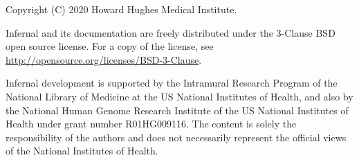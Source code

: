\newpage
\vspace*{\fill}
\begin{flushleft}

\vspace{2em}
Copyright (C) 2020 Howard Hughes Medical Institute.

\vspace{2em}
Infernal and its documentation are freely distributed under the 
3-Clause BSD open source license. For a copy of the license, see
\url{http://opensource.org/licenses/BSD-3-Clause}.

\vspace{2em}
Infernal development is supported by the Intramural Research Program
of the National Library of Medicine at the US National Institutes of
Health, and also by the National Human Genome Research Institute of
the US National Institutes of Health under grant number
R01HG009116. The content is solely the responsibility of the authors
and does not necessarily represent the official views of the National
Institutes of Health.

\end{flushleft}




